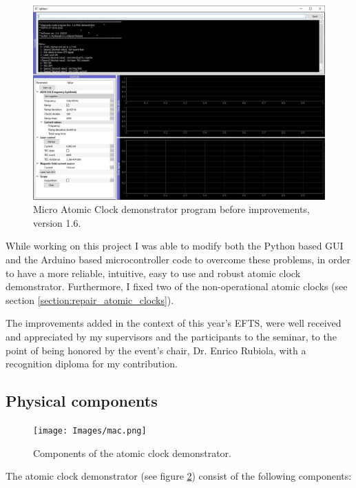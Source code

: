 \documentclass[a4paper,12pt]{article}
\begin{document}
\begin{figure}[!h]
    \centering
    \includegraphics[width=\textwidth]{Images/GUI_v1.6.JPG}
    \captionsetup{justification=centering}
    \caption{Micro Atomic Clock demonstrator program before improvements, version 1.6.} 
    \label{fig:gui_v1.6}
\end{figure}

While working on this project I was able to modify both the Python based GUI and the Arduino based microcontroller code to overcome these problems, in order to have a more reliable, intuitive, easy to use and robust atomic clock demonstrator. Furthermore, I fixed two of the non-operational atomic clocks (see section \ref{section:repair_atomic_clocks}).

The improvements added in the context of this year's EFTS, were well received and appreciated by my supervisors and the participants to the seminar, to the point of being honored by the event's chair, Dr. Enrico Rubiola, with a recognition diploma for my contribution.
\pagebreak

\subsection{Physical components}

\begin{figure}[!h]
    \centering
    \texttt{[image: Images/mac.png]}
    \captionsetup{justification=centering}
    \caption{Components of the atomic clock demonstrator.} 
    \label{fig:mac_components}
\end{figure}

The atomic clock demonstrator (see figure \ref{fig:mac_components}) consist of the following components:
\end{document}
